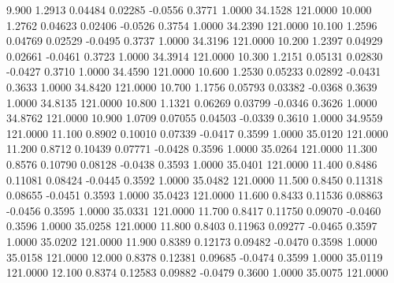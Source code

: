    9.900   1.2913   0.04484   0.02285  -0.0556   0.3771   1.0000  34.1528 121.0000
  10.000   1.2762   0.04623   0.02406  -0.0526   0.3754   1.0000  34.2390 121.0000
  10.100   1.2596   0.04769   0.02529  -0.0495   0.3737   1.0000  34.3196 121.0000
  10.200   1.2397   0.04929   0.02661  -0.0461   0.3723   1.0000  34.3914 121.0000
  10.300   1.2151   0.05131   0.02830  -0.0427   0.3710   1.0000  34.4590 121.0000
  10.600   1.2530   0.05233   0.02892  -0.0431   0.3633   1.0000  34.8420 121.0000
  10.700   1.1756   0.05793   0.03382  -0.0368   0.3639   1.0000  34.8135 121.0000
  10.800   1.1321   0.06269   0.03799  -0.0346   0.3626   1.0000  34.8762 121.0000
  10.900   1.0709   0.07055   0.04503  -0.0339   0.3610   1.0000  34.9559 121.0000
  11.100   0.8902   0.10010   0.07339  -0.0417   0.3599   1.0000  35.0120 121.0000
  11.200   0.8712   0.10439   0.07771  -0.0428   0.3596   1.0000  35.0264 121.0000
  11.300   0.8576   0.10790   0.08128  -0.0438   0.3593   1.0000  35.0401 121.0000
  11.400   0.8486   0.11081   0.08424  -0.0445   0.3592   1.0000  35.0482 121.0000
  11.500   0.8450   0.11318   0.08655  -0.0451   0.3593   1.0000  35.0423 121.0000
  11.600   0.8433   0.11536   0.08863  -0.0456   0.3595   1.0000  35.0331 121.0000
  11.700   0.8417   0.11750   0.09070  -0.0460   0.3596   1.0000  35.0258 121.0000
  11.800   0.8403   0.11963   0.09277  -0.0465   0.3597   1.0000  35.0202 121.0000
  11.900   0.8389   0.12173   0.09482  -0.0470   0.3598   1.0000  35.0158 121.0000
  12.000   0.8378   0.12381   0.09685  -0.0474   0.3599   1.0000  35.0119 121.0000
  12.100   0.8374   0.12583   0.09882  -0.0479   0.3600   1.0000  35.0075 121.0000
